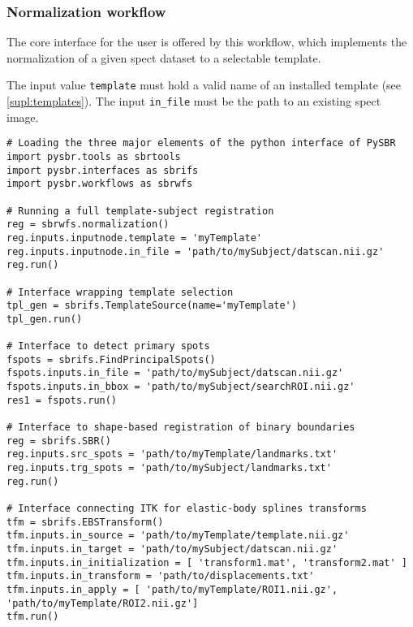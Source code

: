 \documentclass{frontiers}
\begin{document}
\subsubsection*{Normalization workflow} %
The core interface for the user is offered by this workflow,
  which implements the normalization of a given \gls*{spect} 
  dataset to a selectable template.

The input value \texttt{template} must hold a valid name of an installed 
  template (see \autoref{supl:templates}). 
The input \texttt{in\_file} must be the path to an existing \gls*{spect} image.

\begin{lstlisting}[caption={\label{list:interfaces}\textbf{Execution samples.}}]
# Loading the three major elements of the python interface of PySBR
import pysbr.tools as sbrtools
import pysbr.interfaces as sbrifs
import pysbr.workflows as sbrwfs

# Running a full template-subject registration
reg = sbrwfs.normalization()
reg.inputs.inputnode.template = 'myTemplate'
reg.inputs.inputnode.in_file = 'path/to/mySubject/datscan.nii.gz'
reg.run()

# Interface wrapping template selection
tpl_gen = sbrifs.TemplateSource(name='myTemplate')
tpl_gen.run()

# Interface to detect primary spots
fspots = sbrifs.FindPrincipalSpots()
fspots.inputs.in_file = 'path/to/mySubject/datscan.nii.gz'
fspots.inputs.in_bbox = 'path/to/mySubject/searchROI.nii.gz'
res1 = fspots.run()

# Interface to shape-based registration of binary boundaries
reg = sbrifs.SBR()
reg.inputs.src_spots = 'path/to/myTemplate/landmarks.txt'
reg.inputs.trg_spots = 'path/to/mySubject/landmarks.txt'
reg.run()

# Interface connecting ITK for elastic-body splines transforms
tfm = sbrifs.EBSTransform()
tfm.inputs.in_source = 'path/to/myTemplate/template.nii.gz'
tfm.inputs.in_target = 'path/to/mySubject/datscan.nii.gz'
tfm.inputs.in_initialization = [ 'transform1.mat', 'transform2.mat' ]
tfm.inputs.in_transform = 'path/to/displacements.txt'
tfm.inputs.in_apply = [ 'path/to/myTemplate/ROI1.nii.gz', 'path/to/myTemplate/ROI2.nii.gz']
tfm.run()
\end{lstlisting}
\end{document}
